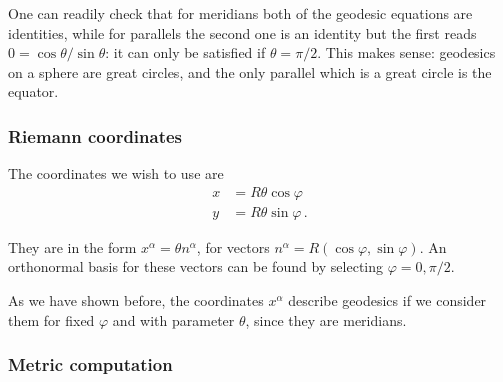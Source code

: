 \documentclass[main.tex]{subfiles}
\begin{document}
One can readily check that for meridians both of the geodesic equations are identities, while for parallels the second one is an identity but the first reads \(0= \cos \theta  / \sin \theta \): it can only be satisfied if \(\theta = \pi /2\).
This makes sense: geodesics on a sphere are great circles, and the only parallel which is a great circle is the equator. 

\subsubsection{Riemann coordinates}

The coordinates we wish to use are 
%
\begin{subequations}
\begin{align}
  x &= R \theta \cos \varphi   \\
  y &= R \theta \sin \varphi 
\,.
\end{align}
\end{subequations}
%

They are in the form \(x^{\alpha } = \theta n^{\alpha }\), for vectors \(n^{\alpha } = R (\cos \varphi, \sin \varphi )\).
An orthonormal basis for these vectors can be found by selecting \(\varphi = 0, \pi /2\). 

As we have shown before, the coordinates \(x^{\alpha }\) describe geodesics if we consider them for fixed \(\varphi \) and with parameter \(\theta \), since they are meridians.

\subsubsection{Metric computation}
\end{document}

